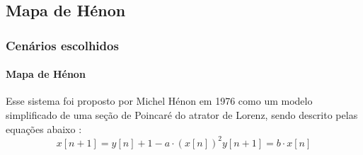 \documentclass[aspectratio=169]{beamer}
\begin{document}
\subsection{Mapa de Hénon}
\begin{frame}
	\frametitle{Cenários escolhidos}
	\framesubtitle{Mapa de Hénon}
	\justifying Esse sistema foi proposto por Michel Hénon em 1976 como um modelo simplificado de uma seção de Poincaré do atrator de Lorenz, sendo descrito pelas equações abaixo \cite{henon1976two}:
\begin{subequations}
\begin{equation}
x[n+1] = y[n] + 1 - a\cdot (x[n])^2
\end{equation}
\begin{equation}
y[n+1] = b \cdot x[n]
\end{equation}
\end{subequations}
\end{frame}
\end{document}
